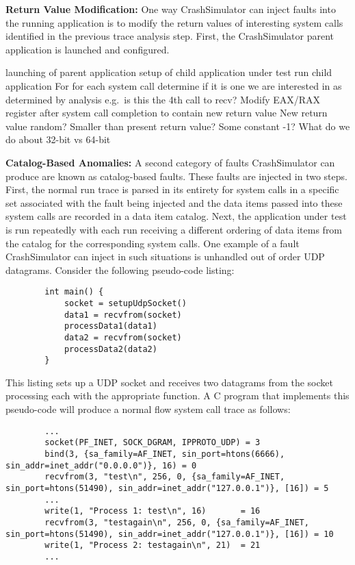     \textbf{Return Value Modification:} One way CrashSimulator can inject faults into the running application is to
    modify the return values of interesting system calls identified in the previous trace analysis step. First, the
    CrashSimulator parent application is launched and configured.

        launching of parent application
        setup of child application under test
        run child application
        For for each system call determine if it is one we are interested in as determined by analysis
            e.g.\ is this the 4th call to recv?
        Modify EAX/RAX register after system call completion to contain new return value
            New return value random? Smaller than present return value? Some constant -1?
            What do we do about 32-bit vs 64-bit

    \textbf{Catalog-Based Anomalies:} A second category of faults CrashSimulator can produce are known as catalog-based
    faults. These faults are injected in two steps. First, the normal run trace is parsed in its entirety for system
    calls in a specific set associated with the fault being injected and the data items passed into these system calls
    are recorded in a data item catalog. Next, the application under test is run repeatedly with each run receiving a
    different ordering of data items from the catalog for the corresponding system calls. One example of a fault
    CrashSimulator can inject in such situations is unhandled out of order UDP datagrams. Consider the following
    pseudo-code listing:

    \begin{verbatim}
        int main() {
            socket = setupUdpSocket()
            data1 = recvfrom(socket)
            processData1(data1)
            data2 = recvfrom(socket)
            processData2(data2)
        }
    \end{verbatim}

    This listing sets up a UDP socket and receives two datagrams from the socket processing each with the appropriate
    function. A C program that implements this pseudo-code will produce a normal flow system call trace as follows:

    \begin{verbatim}
        ...
        socket(PF_INET, SOCK_DGRAM, IPPROTO_UDP) = 3
        bind(3, {sa_family=AF_INET, sin_port=htons(6666), sin_addr=inet_addr("0.0.0.0")}, 16) = 0
        recvfrom(3, "test\n", 256, 0, {sa_family=AF_INET, sin_port=htons(51490), sin_addr=inet_addr("127.0.0.1")}, [16]) = 5
        ...
        write(1, "Process 1: test\n", 16)       = 16
        recvfrom(3, "testagain\n", 256, 0, {sa_family=AF_INET, sin_port=htons(51490), sin_addr=inet_addr("127.0.0.1")}, [16]) = 10
        write(1, "Process 2: testagain\n", 21)  = 21
        ...
    \end{verbatim}

